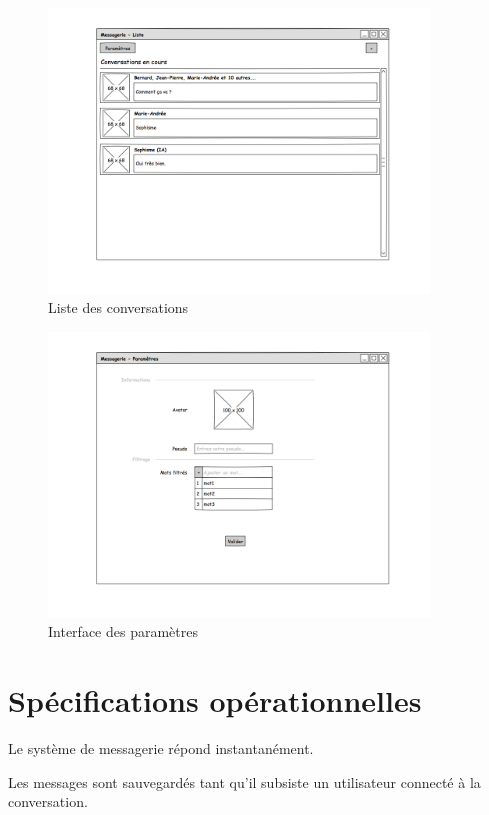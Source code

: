 \documentclass[11pt,dvipsnames,svgnames]{report}
\begin{document}
\begin{figure}[H]
\centerline{\includegraphics[width=0.9\textwidth]{maquette/maquette2.png}}
\caption{Liste des conversations}
\end{figure}

\begin{figure}[H]
\centerline{\includegraphics[width=0.9\textwidth]{maquette/maquette3.png}}
\caption{Interface des paramètres}
\end{figure}


\section{Spécifications opérationnelles}

Le système de messagerie répond instantanément.

Les messages sont sauvegardés tant qu'il subsiste un utilisateur connecté à la conversation.
\end{document}
